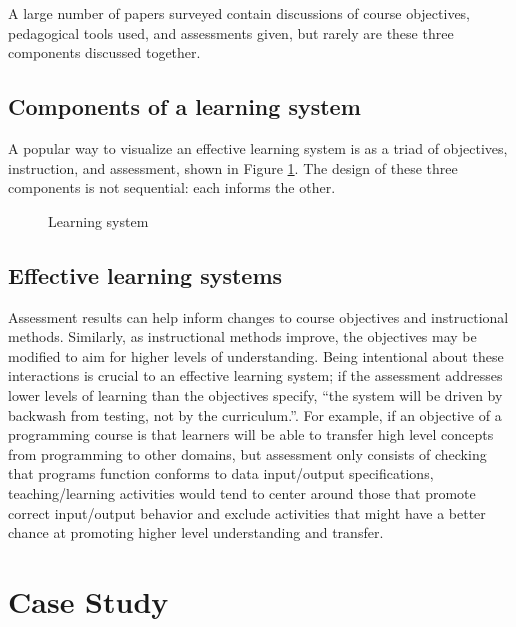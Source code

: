 \documentclass[12pt]{article}
\let\textcite=\autocite
\begin{document}
A large number of papers surveyed contain discussions of course
objectives, pedagogical tools used, and assessments given, but rarely
are these three components discussed together.

\subsection{Components of a learning
system}\label{sec:components-of-a-learning-system}

A popular way to visualize an effective learning system is as a triad
of objectives, instruction, and
assessment\textcite{felder_designing_2003}, shown in Figure
\ref{fig:learning-system}. The design of these three components is not
sequential: each informs the other.

\begin{figure}[h!]
  \centering
  \caption{Learning system}
  \label{fig:learning-system}
\end{figure}

\subsection{Effective learning systems}\label{sec:effective-learning-systems}

Assessment results can help inform changes to course objectives and
instructional methods\autocite{felder_designing_2003}. Similarly, as
instructional methods improve, the objectives may be modified to aim
for higher levels of understanding. Being intentional about these
interactions is crucial to an effective learning system; if the
assessment addresses lower levels of learning than the objectives
specify, ``the system will be driven by backwash from testing, not by
the curriculum.''\autocite[][p. 350]{biggs_enhancing_1996}. For
example, if an objective of a programming course is that learners will
be able to transfer high level concepts from programming to other
domains, but assessment only consists of checking that programs
function conforms to data input/output specifications,
teaching/learning activities would tend to center around those that
promote correct input/output behavior and exclude activities that
might have a better chance at promoting higher level understanding and
transfer\autocite{biggs_enhancing_1996}.

\section{Case Study}
\end{document}
